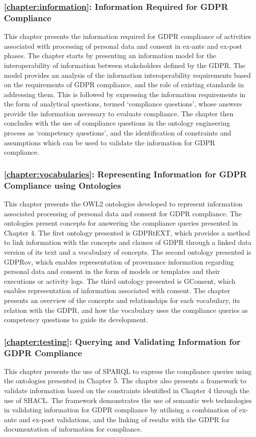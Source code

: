 \subsubsection{\autoref{chapter:information}: Information Required for GDPR Compliance}
This chapter presents the information required for GDPR compliance of activities associated with processing of personal data and consent in ex-ante and ex-post phases.
The chapter starts by presenting an information model for the interoperability of information between stakeholders defined by the GDPR.
The model provides an analysis of the information interoperability requirements based on the requirements of GDPR compliance, and the role of existing standards in addressing them.
This is followed by expressing the information requirements in the form of analytical questions, termed `compliance questions', whose answers provide the information necessary to evaluate compliance. 
The chapter then concludes with the use of compliance questions in the ontology engineering process as `competency questions', and the identification of constraints and assumptions which can be used to validate the information for GDPR compliance.

\subsubsection{\autoref{chapter:vocabularies}: Representing Information for GDPR Compliance using Ontologies}
This chapter presents the OWL2 ontologies developed to represent information associated processing of personal data and consent for GDPR compliance.
The ontologies present concepts for answering the compliance queries presented in Chapter 4. The first ontology presented is GDPRtEXT, which provides a method to link information with the concepts and clauses of GDPR through a linked data version of its text and a vocabulary of concepts. The second ontology presented is GDPRov, which enables representation of provenance information regarding personal data and consent in the form of models or templates and their executions or activity logs. The third ontology presented is GConsent, which enables representation of information associated with consent. The chapter presents an overview of the concepts and relationships for each vocabulary, its relation with the GDPR, and how the vocabulary uses the compliance queries as competency questions to guide its development.

\subsubsection{\autoref{chapter:testing}: Querying and Validating Information for GDPR Compliance}
This chapter presents the use of SPARQL to express the compliance queries using the ontologies presented in Chapter 5. The chapter also presents a framework to validate information based on the constraints identified in Chapter 4 through the use of SHACL. The framework demonstrates the use of semantic web technologies in validating information for GDPR compliance by utilising a combination of ex-ante and ex-post validations, and the linking of results with the GDPR for documentation of information for compliance.

